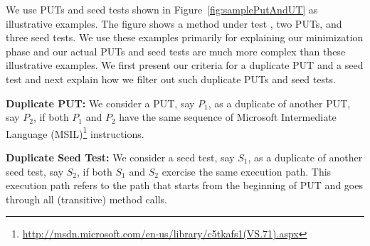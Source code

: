 We use PUTs and seed tests shown in Figure~\ref{fig:samplePutAndUT} as illustrative examples. The figure shows a method under test , two PUTs, and three seed tests. We use these examples primarily for explaining our minimization phase and our actual PUTs and seed tests are much more complex than these illustrative examples. We first present our criteria for a duplicate PUT and a seed test and next explain how we filter out such duplicate PUTs and seed tests.

\textbf{Duplicate PUT:} We consider a PUT, say $P_1$, as a duplicate of another PUT, say $P_2$, if both $P_1$ and $P_2$ have the same sequence of Microsoft Intermediate Language (MSIL)\footnote{\url{http://msdn.microsoft.com/en-us/library/c5tkafs1(VS.71).aspx}} instructions.

\textbf{Duplicate Seed Test:} We consider a seed test, say $S_1$, as a duplicate of another seed test, say $S_2$, if both $S_1$ and $S_2$ exercise the same execution path.
This execution path refers to the path that starts from the beginning of PUT and goes through all (transitive) method calls.

